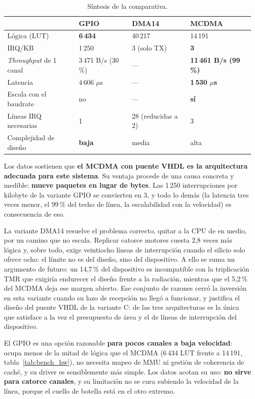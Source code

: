 \begin{table}[H]
    \centering
    \small
    \begin{tabular}{llll}
        \hline
         & \textbf{GPIO} & \textbf{DMA14} & \textbf{MCDMA} \\
        \hline
        Lógica (LUT) & \textbf{6\,434} & 40\,217 & 14\,191 \\
        IRQ/KB & 1\,250 & 3 (solo TX) & \textbf{3} \\
        \textit{Throughput} de 1 canal & 3\,471 B/s (30\,\%) & --- & \textbf{11\,461 B/s (99\,\%)} \\
        Latencia & 4\,606 $\mu$s & --- & \textbf{1\,530 $\mu$s} \\
        Escala con el baudrate & no & --- & \textbf{sí} \\
        Líneas IRQ necesarias & 1 & 28 (reducidas a 2) & 3 \\
        Complejidad de diseño & \textbf{baja} & media & alta \\
        \hline
    \end{tabular}
    \caption{Síntesis de la comparativa.}
    \label{tab:bench_resumen}
\end{table}

Los datos sostienen que \textbf{el MCDMA con puente VHDL es la arquitectura adecuada para este
sistema}. Su ventaja procede de una causa concreta y medible: \textbf{mueve paquetes en lugar de
bytes}. Las 1\,250 interrupciones por kilobyte de la variante GPIO se convierten en 3, y todo lo
demás (la latencia tres veces menor, el 99\,\% del techo de línea, la escalabilidad con la
velocidad) es consecuencia de eso.

La variante DMA14 resuelve el problema correcto, quitar a la CPU de en medio, por un camino que no
escala. Replicar catorce motores cuesta 2,8 veces más lógica y, sobre todo, exige veintiocho
líneas de interrupción cuando el silicio solo ofrece ocho: el límite no es del diseño, sino del
dispositivo. A ello se suma un argumento de futuro: un 14,7\,\% del dispositivo es incompatible
con la triplicación TMR que exigiría endurecer el diseño frente a la radiación, mientras que el
5,2\,\% del MCDMA deja ese margen abierto. Ese conjunto de razones cerró la inversión en esta
variante cuando su lazo de recepción no llegó a funcionar, y justifica el diseño del puente VHDL
de la variante C: de las tres arquitecturas es la única que satisface a la vez el presupuesto de
área y el de líneas de interrupción del dispositivo.

El GPIO es una opción razonable \textbf{para pocos canales a baja velocidad}: ocupa menos de la mitad de lógica que el MCDMA
(6\,434 LUT frente a 14\,191, tabla~\ref{tab:bench_hw}), no necesita mapeo de MMU ni gestión de coherencia de caché, y su driver es
sensiblemente más simple. Los datos acotan su uso: \textbf{no sirve para catorce canales}, y su
limitación no se cura subiendo la velocidad de la línea, porque el cuello de botella está en el
otro extremo.
